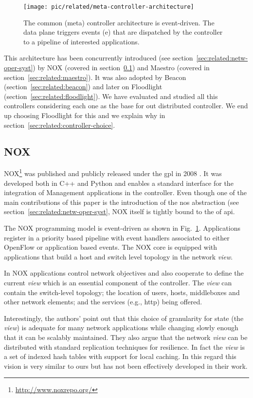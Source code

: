 \begin{figure}[ht]
  \centering
\texttt{[image: pic/related/meta-controller-architecture]}
  \caption[Controller Architecture]{The common (meta) controller architecture is event-driven. The data plane triggers events (e) that are dispatched by the controller to a pipeline of interested applications. }
\label{fig:related:meta-architecture}
\end{figure}
This architecture has been concurrently introduced (see section~\ref{sec:related:netw-oper-syst}) by NOX (covered in section~\ref{sec:related:nox}) and Maestro (covered in section~\ref{sec:related:maestro}).  It was also adopted by Beacon (section~\ref{sec:related:beacon})  and later on Floodlight (section~\ref{sec:related:floodlight}). 
We have evaluated and studied all this controllers considering each one as the base for out distributed controller. 
We end up choosing Floodlight for this and we explain why in section~\ref{sec:related:controller-choice}. 

\subsection{NOX}
\label{sec:related:nox}

NOX\footnote{\url{http://www.noxrepo.org/}} was published and publicly released under
the \gls{gpl} in 2008 \cite{Gude:2008jd}. 
It was developed both in C++ and Python and enables a standard interface for the integration of  Management applications 
in the controller. 
Even though one of the main contributions of this paper is the introduction of the \gls{nos}  abstraction (see section~\ref{sec:related:netw-oper-syst}, NOX itself  is tightly bound to the \gls{of} \gls{api}. 

The NOX programming model is event-driven as shown in Fig.~\ref{fig:related:meta-architecture}.
Applications  register in a
priority based pipeline with event handlers associated to either OpenFlow  or application based events. 
The NOX core is equipped with applications that build a host and switch level topology in the network \emph{view}. 

In NOX applications control network objectives and also cooperate to define the current \emph{view} which is an essential component of the controller. 
The \emph{view} can contain the switch-level topology; the location of users, hosts, middleboxes and other network elements; and the services (e.g., \gls{http}) being offered. 

Interestingly, the authors' point out that this choice of granularity for state (the \emph{view}) is adequate for many network applications while changing slowly enough that it can be scalably  maintained. 
They also argue that the network \emph{view} can be distributed with standard replication techniques for resilience. 
In fact the \emph{view} is a set of indexed hash tables with support for local caching. 
In this regard this vision is very similar to ours but has not been effectively developed in their work. 

